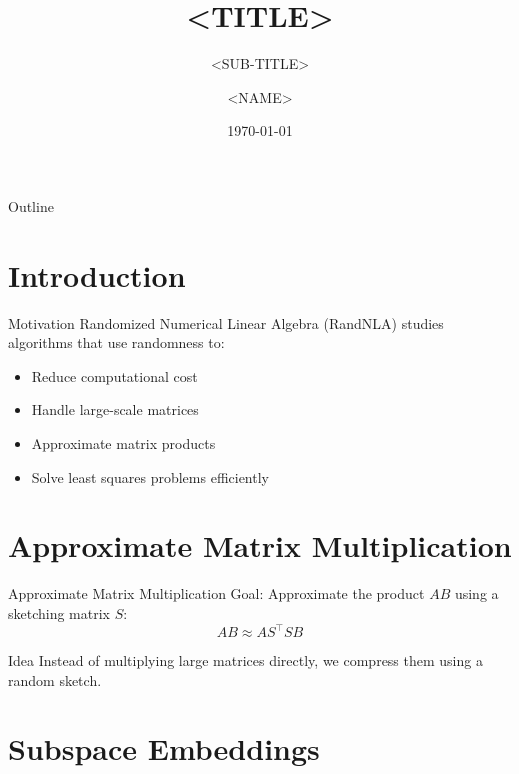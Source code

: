 \documentclass[10pt]{beamer}
\title{<TITLE>}
\subtitle{<SUB-TITLE>}
\date{\today}
\author{<NAME>}
\institute{<SCHOOL>}
\begin{document}
\maketitle

\begin{frame}{Outline}
\tableofcontents
\end{frame}

\section{Introduction}

\begin{frame}{Motivation}
Randomized Numerical Linear Algebra (RandNLA) studies algorithms that use randomness to:
\begin{itemize}
    \item Reduce computational cost
    \item Handle large-scale matrices
    \item Approximate matrix products
    \item Solve least squares problems efficiently
\end{itemize}
\end{frame}

\section{Approximate Matrix Multiplication}

\begin{frame}{Approximate Matrix Multiplication}
Goal: Approximate the product $AB$ using a sketching matrix $S$:
\[
AB \approx A S^\top S B
\]

\begin{block}{Idea}
Instead of multiplying large matrices directly, we compress them using a random sketch.
\end{block}
\end{frame}

\section{Subspace Embeddings}
\end{document}
